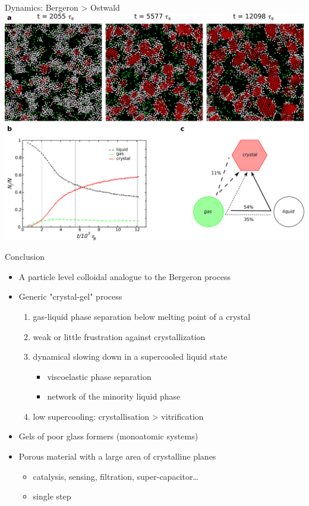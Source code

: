 \documentclass[xcolor=table]{beamer}
\begin{document}
\begin{frame}{Dynamics: Bergeron > Ostwald}
\vspace{\baselineskip}
\includegraphics[width=\textwidth]{nature/fig4.pdf}
\end{frame}

\begin{frame}{Conclusion}
	\begin{itemize}
		\item A particle level colloidal analogue to the Bergeron process
		\item Generic "crystal-gel" process
		\begin{enumerate}
			\item gas-liquid phase separation below melting point
		of a crystal
			\item weak or little frustration against crystallization
			\item dynamical slowing down in a supercooled liquid state
			\begin{itemize}
				\item viscoelastic phase separation
				\item network of the minority liquid phase
			\end{itemize}
			\item low supercooling: crystallisation > vitrification
		\end{enumerate}
		\item Gels of poor glass formers (monoatomic systems)
		\item Porous material with a large area of crystalline planes
		\begin{itemize}
			\item catalysis, sensing, filtration, super-capacitor\ldots
			\item single step
		\end{itemize}
	\end{itemize}
\end{frame}
\end{document}
